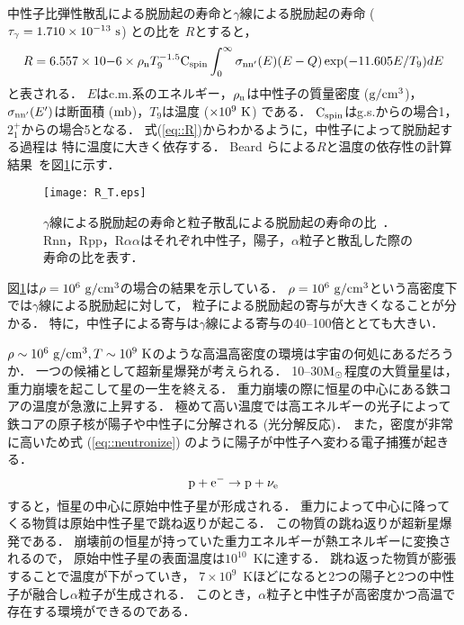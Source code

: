\documentclass[../master]{subfiles}
\begin{document}
中性子比弾性散乱による脱励起の寿命と$\gamma$線による脱励起の寿命 ($\tau_{\gamma} = 1.710\times10^{-13}~{\rm s}$) との比を
$R$とすると，
\begin{equation}
  R = 6.557\times10{-6}\times\rho_{\rm n}T_{9}^{-1.5}{\rm C}_{{\rm spin}}
  \int^{\infty}_{0}\sigma_{\rm nn'}(E)(E-Q)\exp(-11.605E/T_{9})dE
  \label{eq::R}
\end{equation}
と表される．
$E$はc.m.系のエネルギー，$\rho_{\rm n}$は中性子の質量密度 (${\rm g}/{\rm cm}^{3}$)，
$\sigma_{\rm nn'}(E')$は断面積 (${\rm mb}$)，$T_{9}$は温度 ($\times10^{9}~{\rm K}$) である．
${\rm C}_{{\rm spin}}$はg.s.からの場合1，
$2_{1}^{+}$からの場合5となる．
式(\ref{eq::R})からわかるように，中性子によって脱励起する過程は
特に温度に大きく依存する．
Beard らによる$R$と温度の依存性の計算結果~\cite{hotdensemedium}を図\ref{fig::R}に示す．
\begin{figure}
  \centering
  \texttt{[image: R\_T.eps]}
  \caption[$\gamma$線による脱励起の寿命と粒子散乱による脱励起の寿命の比．]
          {$\gamma$線による脱励起の寿命と粒子散乱による脱励起の寿命の比~\cite{hotdensemedium}．
    Rnn，Rpp，R$\alpha\alpha$はそれぞれ中性子，陽子，$\alpha$粒子と散乱した際の寿命の比を表す．}
  \label{fig::R}
\end{figure}
図\ref{fig::R}は$\rho = 10^{6}~{\rm g}/{\rm cm}^{3}$の場合の結果を示している．
$\rho = 10^{6}~{\rm g}/{\rm cm}^{3}$という高密度下では$\gamma$線による脱励起に対して，
粒子による脱励起の寄与が大きくなることが分かる．
特に，中性子による寄与は$\gamma$線による寄与の40--100倍ととても大きい．

$\rho\sim10^{6}~{\rm g}/{\rm cm^{3}}, T\sim10^{9}~{\rm K}$のような高温高密度の環境は宇宙の何処にあるだろうか．
一つの候補として超新星爆発が考えられる．
10--30$\rm M_{\odot}$程度の大質量星は，重力崩壊を起こして星の一生を終える．
重力崩壊の際に恒星の中心にある鉄コアの温度が急激に上昇する．
極めて高い温度では高エネルギーの光子によって鉄コアの原子核が陽子や中性子に分解される (光分解反応)．
また，密度が非常に高いため式 (\ref{eq::neutronize}) のように陽子が中性子へ変わる電子捕獲が起きる．
\begin{equation}
  {\rm p}+{\rm e}^{-} \rightarrow {\rm p}+\nu_{\rm e}
  \label{eq::neutronize}
\end{equation}
すると，恒星の中心に原始中性子星が形成される．
重力によって中心に降ってくる物質は原始中性子星で跳ね返りが起こる．
この物質の跳ね返りが超新星爆発である．
崩壊前の恒星が持っていた重力エネルギーが熱エネルギーに変換されるので，
原始中性子星の表面温度は$10^10$~Kに達する．
跳ね返った物質が膨張することで温度が下がっていき，
$7\times10^9$~Kほどになると2つの陽子と2つの中性子が融合し$\alpha$粒子が生成される．
このとき，$\alpha$粒子と中性子が高密度かつ高温で存在する環境ができるのである．
\end{document}
